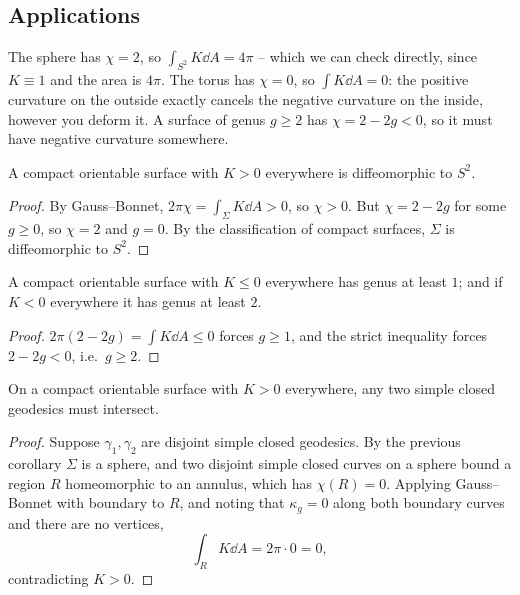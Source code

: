 \subsection{Applications}

\begin{example}
    The sphere has $\chi = 2$, so $\int_{S^2}K \dd A = 4\pi$ -- which we can check directly, since $K \equiv 1$ and the area is $4\pi$. The torus has $\chi = 0$, so $\int K \dd A = 0$: the positive curvature on the outside exactly cancels the negative curvature on the inside, however you deform it. A surface of genus $g \geq 2$ has $\chi = 2-2g < 0$, so it must have negative curvature somewhere.
\end{example}

\begin{corollary}
    A compact orientable surface with $K > 0$ everywhere is diffeomorphic to $S^2$.
\end{corollary}
\begin{proof}
    By Gauss--Bonnet, $2\pi\chi = \int_\Sigma K\dd A > 0$, so $\chi > 0$. But $\chi = 2 - 2g$ for some $g \geq 0$, so $\chi = 2$ and $g = 0$. By the classification of compact surfaces, $\Sigma$ is diffeomorphic to $S^2$.
\end{proof}

\begin{corollary}
    A compact orientable surface with $K \leq 0$ everywhere has genus at least $1$; and if $K < 0$ everywhere it has genus at least $2$.
\end{corollary}
\begin{proof}
    $2\pi(2-2g) = \int K \dd A \leq 0$ forces $g \geq 1$, and the strict inequality forces $2-2g < 0$, i.e.\ $g \geq 2$.
\end{proof}

\begin{proposition}
    On a compact orientable surface with $K > 0$ everywhere, any two simple closed geodesics must intersect.
\end{proposition}
\begin{proof}
    Suppose $\gamma_1, \gamma_2$ are disjoint simple closed geodesics. By the previous corollary $\Sigma$ is a sphere, and two disjoint simple closed curves on a sphere bound a region $R$ homeomorphic to an annulus, which has $\chi(R) = 0$. Applying Gauss--Bonnet with boundary to $R$, and noting that $\kappa_g = 0$ along both boundary curves and there are no vertices,
    $$
    \int_R K \dd A = 2\pi\cdot 0 = 0,
    $$
    contradicting $K > 0$.
\end{proof}

